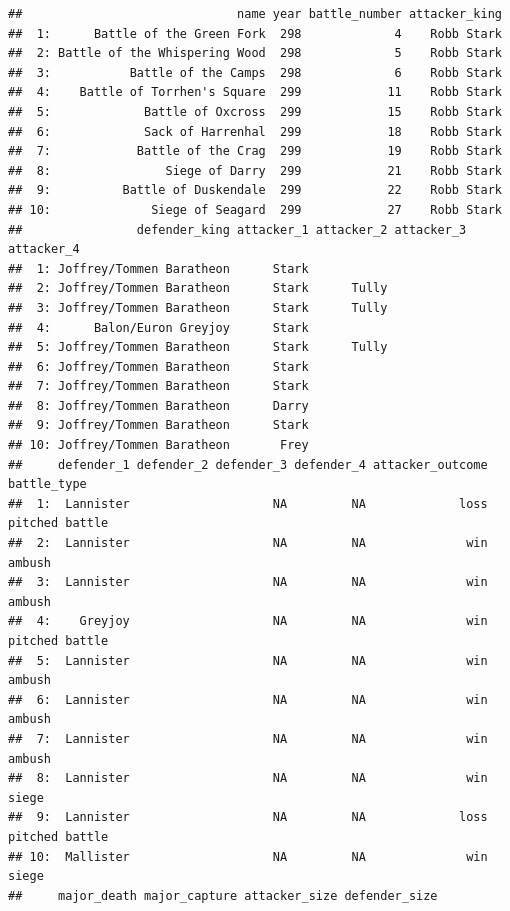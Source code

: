 \documentclass[]{book}
\begin{document}
\begin{verbatim}
##                              name year battle_number attacker_king
##  1:      Battle of the Green Fork  298             4    Robb Stark
##  2: Battle of the Whispering Wood  298             5    Robb Stark
##  3:           Battle of the Camps  298             6    Robb Stark
##  4:    Battle of Torrhen's Square  299            11    Robb Stark
##  5:             Battle of Oxcross  299            15    Robb Stark
##  6:             Sack of Harrenhal  299            18    Robb Stark
##  7:            Battle of the Crag  299            19    Robb Stark
##  8:                Siege of Darry  299            21    Robb Stark
##  9:          Battle of Duskendale  299            22    Robb Stark
## 10:              Siege of Seagard  299            27    Robb Stark
##                defender_king attacker_1 attacker_2 attacker_3 attacker_4
##  1: Joffrey/Tommen Baratheon      Stark                                 
##  2: Joffrey/Tommen Baratheon      Stark      Tully                      
##  3: Joffrey/Tommen Baratheon      Stark      Tully                      
##  4:      Balon/Euron Greyjoy      Stark                                 
##  5: Joffrey/Tommen Baratheon      Stark      Tully                      
##  6: Joffrey/Tommen Baratheon      Stark                                 
##  7: Joffrey/Tommen Baratheon      Stark                                 
##  8: Joffrey/Tommen Baratheon      Darry                                 
##  9: Joffrey/Tommen Baratheon      Stark                                 
## 10: Joffrey/Tommen Baratheon       Frey                                 
##     defender_1 defender_2 defender_3 defender_4 attacker_outcome    battle_type
##  1:  Lannister                    NA         NA             loss pitched battle
##  2:  Lannister                    NA         NA              win         ambush
##  3:  Lannister                    NA         NA              win         ambush
##  4:    Greyjoy                    NA         NA              win pitched battle
##  5:  Lannister                    NA         NA              win         ambush
##  6:  Lannister                    NA         NA              win         ambush
##  7:  Lannister                    NA         NA              win         ambush
##  8:  Lannister                    NA         NA              win          siege
##  9:  Lannister                    NA         NA             loss pitched battle
## 10:  Mallister                    NA         NA              win          siege
##     major_death major_capture attacker_size defender_size

\end{verbatim}
\end{document}
